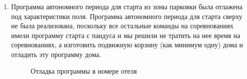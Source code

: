 \begin{enumerate}
	\item Программа автономного периода для старта из зоны парковки была отлажена под характеристики поля. Программа автономного периода для старта сверху не была реализована, поскольку все остальные команды на соревнованиях имели программу старта с пандуса и мы решили не тратить на нее время на соревнованиях, а изготовить подвижную корзину (как минимум одну) дома и отладить эту программу дома.
	\begin{figure}[H]
		\begin{minipage}[h]{0.47\linewidth}
		\end{minipage}
		\hfill
		\begin{minipage}[h]{0.47\linewidth}
		\end{minipage}
		\caption{Отладка программы в номере отеля}
	\end{figure}
	
\end{enumerate}
\fillpage